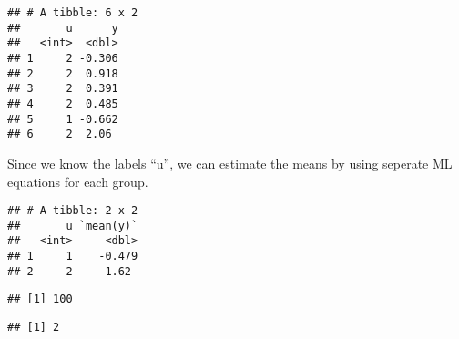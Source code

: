 \documentclass[]{article}
\newenvironment{Shaded}{\begin{snugshade}}{\end{snugshade}}
\newcommand{\DataTypeTok}[1]{\textcolor[rgb]{0.13,0.29,0.53}{#1}}
\newcommand{\DecValTok}[1]{\textcolor[rgb]{0.00,0.00,0.81}{#1}}
\newcommand{\KeywordTok}[1]{\textcolor[rgb]{0.13,0.29,0.53}{\textbf{#1}}}
\newcommand{\NormalTok}[1]{#1}
\newcommand{\OperatorTok}[1]{\textcolor[rgb]{0.81,0.36,0.00}{\textbf{#1}}}
\newcommand{\StringTok}[1]{\textcolor[rgb]{0.31,0.60,0.02}{#1}}
\begin{document}
\begin{verbatim}
## # A tibble: 6 x 2
##       u      y
##   <int>  <dbl>
## 1     2 -0.306
## 2     2  0.918
## 3     2  0.391
## 4     2  0.485
## 5     1 -0.662
## 6     2  2.06
\end{verbatim}

Since we know the labels ``u'', we can estimate the means by using
seperate ML equations for each group.

\begin{Shaded}
\end{Shaded}

\begin{verbatim}
## # A tibble: 2 x 2
##       u `mean(y)`
##   <int>     <dbl>
## 1     1    -0.479
## 2     2     1.62
\end{verbatim}

\begin{Shaded}
\end{Shaded}

\begin{verbatim}
## [1] 100
\end{verbatim}

\begin{Shaded}
\end{Shaded}

\begin{verbatim}
## [1] 2
\end{verbatim}

\begin{Shaded}
\end{Shaded}
\end{document}
